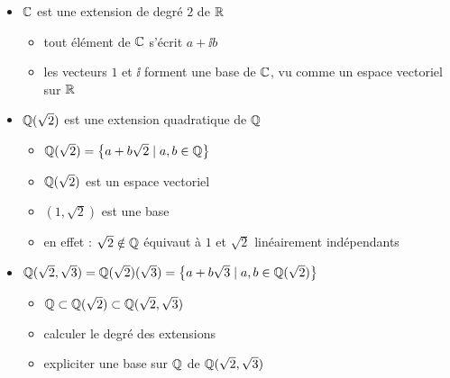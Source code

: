 \begin{frame}
\begin{exemple}
\begin{itemize}[<+->]  
  \item $\mathbb{C}$ est une extension de degré $2$ de $\mathbb{R}$
  \begin{itemize}[<+->]
    \item tout élément de $\mathbb{C}$ s'écrit $a+\ii b$
    \item les vecteurs $1$ et $\ii$ forment une base de $\mathbb{C}$, vu comme un espace vectoriel sur $\mathbb{R}$
  \end{itemize}
  
\medskip  
  \item $\mathbb{Q}(\sqrt 2)$ est une extension quadratique de $\mathbb{Q}$
  \begin{itemize}[<+->]
    \item $\mathbb{Q}(\sqrt 2) = \big\{ a+b\sqrt 2 \mid a,b \in \mathbb{Q} \big\}$
    \item $\mathbb{Q}(\sqrt 2)$ est un espace vectoriel
    \item $(1,\sqrt 2)$ est une base
    \item en effet : $\sqrt{2} \notin \mathbb{Q}$ équivaut à $1$ et $\sqrt{2}$ linéairement indépendants
  \end{itemize}

\medskip  
  \item $\mathbb{Q}(\sqrt 2, \sqrt 3) = \mathbb{Q}(\sqrt 2)(\sqrt 3) = \big\{ a+ b \sqrt 3 \mid a,b \in \mathbb{Q}(\sqrt 2) \big\}$
  \begin{itemize}[<+->]
    \item $\mathbb{Q} \subset \mathbb{Q}(\sqrt 2) \subset \mathbb{Q}(\sqrt 2, \sqrt 3)$
    \item calculer le degré des extensions
    \item expliciter une base sur $\mathbb{Q}$ de $\mathbb{Q}(\sqrt 2, \sqrt 3)$
  \end{itemize}
\end{itemize}
\end{exemple}

\end{frame}


